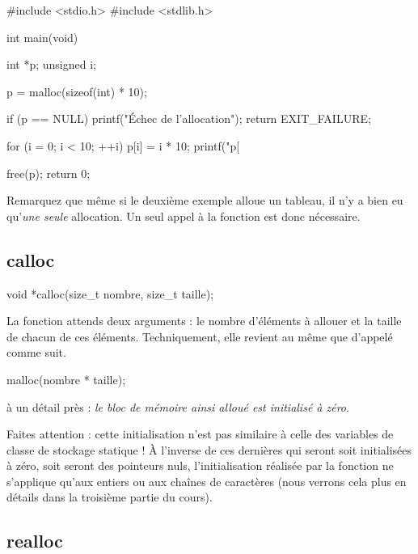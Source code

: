 \begin{C}
#include <stdio.h>
#include <stdlib.h>


int main(void)
{
    int *p;
    unsigned i;

    p = malloc(sizeof(int) * 10);

    if (p == NULL)
    {
        printf("Échec de l'allocation\n");
        return EXIT_FAILURE;
    }

    for (i = 0; i < 10; ++i)
    {
        p[i] = i * 10;
        printf("p[%
    }

    free(p);
    return 0;
}
\end{C}

\begin{infobox}
Remarquez que même si le deuxième exemple alloue un tableau, il 
n'y a bien eu qu'\emph{une seule} allocation. Un seul appel à la 
fonction  est donc nécessaire.
\end{infobox}


\subsection{calloc}
\label{calloc}

\begin{C}
void *calloc(size_t nombre, size_t taille);
\end{C}

La fonction  attends deux arguments : le nombre
d'éléments à allouer et la taille de chacun de ces éléments.
Techniquement, elle revient au même que d'appelé  comme
suit.

\begin{C}
malloc(nombre * taille);
\end{C}

à un détail près : \emph{le bloc de mémoire ainsi alloué est initialisé
à zéro}.

\begin{erreurbox}
Faites attention : cette initialisation n'est pas similaire à celle des 
variables de classe de stockage statique ! À l'inverse de ces dernières 
qui seront soit initialisées à zéro, soit seront des pointeurs nuls, 
l'initialisation réalisée par la fonction  ne s'applique 
qu'aux entiers ou aux chaînes de caractères (nous verrons cela plus en détails 
dans la troisième partie du cours).
\end{erreurbox}

\subsection{realloc}
\label{realloc}

